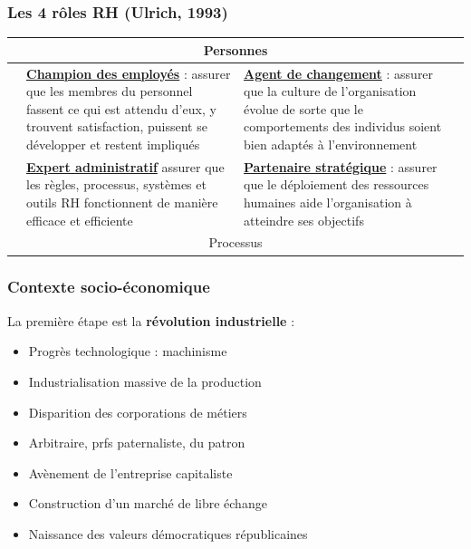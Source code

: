 \documentclass[12pt]{beamer}
\begin{document}
  \begin{frame}
    \frametitle{Les 4 rôles RH (Ulrich, 1993)}
	\begin{tabular}{cp{4.8cm}|p{4.8cm}c}
	& \multicolumn{2}{c}{Personnes} & \\
	\hline
	 \multirow{2}{2mm}{\rotatebox{90}{Opérationnel}} & \textbf{\underline{Champion des employés}} : assurer que les membres du personnel fassent ce qui est attendu d'eux, y trouvent satisfaction, puissent se développer et restent impliqués & \textbf{\underline{Agent de changement}} : assurer que la culture de l'organisation évolue de sorte que le comportements des individus soient bien adaptés à l'environnement & \multirow{2}{2mm}{\rotatebox{270}{Stratégique}} \\
	 \hline
	  & \textbf{\underline{Expert administratif}} assurer que les règles, processus, systèmes et outils RH fonctionnent de manière efficace et efficiente  & \textbf{\underline{Partenaire stratégique}} : assurer que le déploiement des ressources humaines aide l'organisation à atteindre ses objectifs & \\
	  \hline
	& \multicolumn{2}{c}{Processus} & \multicolumn{1}{l}{} \\      
	\end{tabular}
  \end{frame}
  
  \begin{frame}
      \frametitle{Contexte socio-économique}
      La première étape est la \textbf{révolution industrielle} :
      
      \begin{itemize}
       \item Progrès technologique : machinisme
       \item Industrialisation massive de la production
       \item Disparition des corporations de métiers
       \item Arbitraire, prfs paternaliste, du patron
       \item Avènement de l'entreprise capitaliste
       \item Construction d'un marché de libre échange
       \item Naissance des valeurs démocratiques républicaines
      \end{itemize}
  \end{frame}
  
\end{document}
